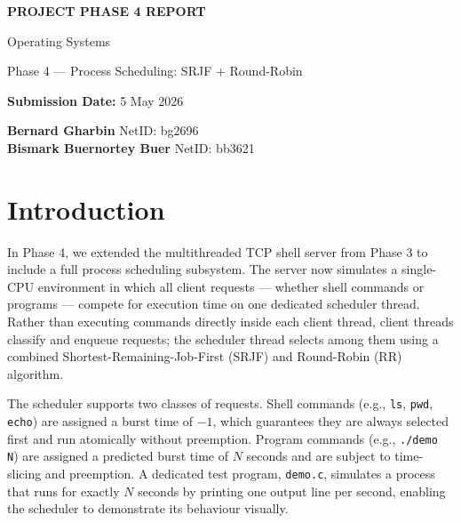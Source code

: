 \documentclass[12pt]{article}
\begin{document}
\begin{titlepage}
    \centering
    \vspace*{3cm}
    {\LARGE\bfseries PROJECT PHASE 4 REPORT\par}
    \vspace{0.5cm}
    {\large Operating Systems\par}
    {\large Phase 4 --- Process Scheduling: SRJF + Round-Robin\par}
    \vspace{1cm}
    {\large\textbf{Submission Date:} 5 May 2026\par}
    \vspace{0.5cm}
    {\large
        \textbf{Bernard Gharbin} \quad NetID: bg2696\\[0.3em]
        \textbf{Bismark Buernortey Buer} \quad NetID: bb3621
    \par}
\end{titlepage}

\tableofcontents
\newpage

\section{Introduction}

In Phase 4, we extended the multithreaded TCP shell server from Phase 3 to include a
full process scheduling subsystem. The server now simulates a single-CPU environment in
which all client requests --- whether shell commands or programs --- compete for execution
time on one dedicated scheduler thread. Rather than executing commands directly inside
each client thread, client threads classify and enqueue requests; the scheduler thread
selects among them using a combined Shortest-Remaining-Job-First (SRJF) and Round-Robin
(RR) algorithm.

The scheduler supports two classes of requests. Shell commands (e.g., \texttt{ls},
\texttt{pwd}, \texttt{echo}) are assigned a burst time of $-1$, which guarantees they
are always selected first and run atomically without preemption. Program commands
(e.g., \texttt{./demo N}) are assigned a predicted burst time of $N$ seconds and are
subject to time-slicing and preemption. A dedicated test program, \texttt{demo.c},
simulates a process that runs for exactly $N$ seconds by printing one output line per
second, enabling the scheduler to demonstrate its behaviour visually.
\end{document}
